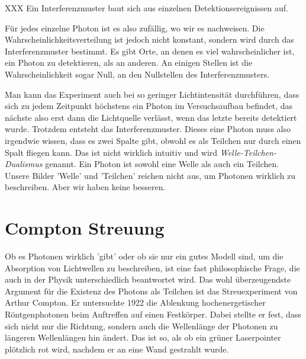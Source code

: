 \begin{marginfigure}
    \caption{XXX Ein Interferenzmuster baut sich aus einzelnen Detektionsereignissen auf.}
    \label{fig:2_sim_photon}
\end{marginfigure}

 Für jedes einzelne Photon ist es also zufällig, wo wir es nachweisen. Die Wahrscheinlichkeitsverteilung ist jedoch nicht konstant, sondern wird durch das Interferenzmuster bestimmt. Es gibt Orte, an denen es viel wahrscheinlicher ist, ein Photon zu detektieren, als an anderen. An einigen Stellen ist die Wahrscheinlichkeit sogar Null, an den Nullstellen des Interferenzmusters.

 Man kann das Experiment auch bei so geringer Lichtintensität durchführen, dass sich zu jedem Zeitpunkt höchstens ein Photon im Versuchsaufbau befindet, das nächste also erst dann die Lichtquelle verlässt, wenn das letzte bereits detektiert wurde. Trotzdem entsteht das Interferenzmuster. Dieses eine Photon muss also irgendwie wissen, dass es zwei Spalte gibt, obwohl es als Teilchen nur durch einen Spalt fliegen kann. Das ist nicht wirklich intuitiv und wird \emph{Welle-Teilchen-Dualismus} genannt. Ein Photon ist sowohl eine Welle als auch ein Teilchen. Unsere Bilder 'Welle' und 'Teilchen' reichen nicht aus, um Photonen wirklich zu beschreiben. Aber wir haben keine besseren.



 \section{Compton Streuung}

 Ob es Photonen wirklich 'gibt' oder ob sie nur ein gutes Modell sind, um die Absorption von Lichtwellen zu beschreiben, ist eine fast philosophische Frage, die auch in der Physik unterschiedlich beantwortet wird. Das wohl überzeugendste Argument für die Existenz des Photons als Teilchen ist das Streuexperiment von Arthur Compton. Er untersuchte 1922 die Ablenkung hochenergetischer Röntgenphotonen beim Auftreffen auf einen Festkörper. Dabei stellte er fest, dass sich nicht nur die Richtung, sondern auch die Wellenlänge der Photonen zu längeren Wellenlängen hin ändert. Das ist so, als ob ein grüner Laserpointer plötzlich rot wird, nachdem er an eine Wand gestrahlt wurde.

